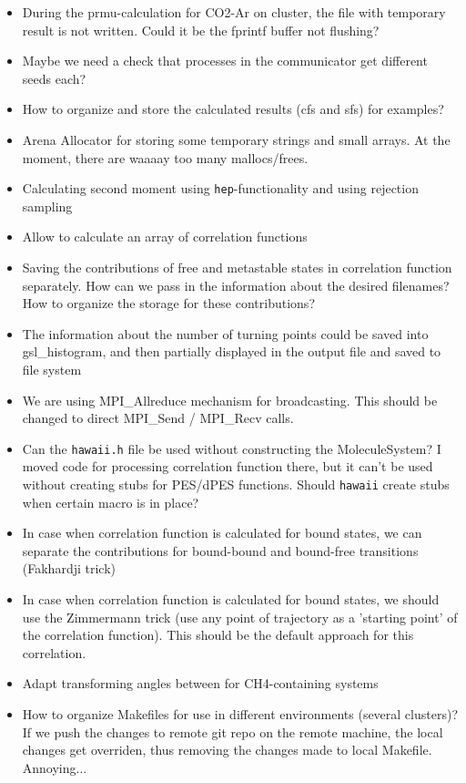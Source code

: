 \documentclass{article}
\begin{document}
\begin{itemize}
    \item During the prmu-calculation for CO2-Ar on cluster, the file with temporary result is not written. Could it be the fprintf buffer not flushing?  
    \item Maybe we need a check that processes in the communicator get different seeds each?
    \item How to organize and store the calculated results (cfs and sfs) for examples?
    \item Arena Allocator for storing some temporary strings and small arrays. At the moment, there are waaaay too many mallocs/frees. 
    \item Calculating second moment using \texttt{hep}-functionality and using rejection sampling
    \item Allow to calculate an array of correlation functions 
    \item Saving the contributions of free and metastable states in correlation function separately. How can we pass in the information about the desired filenames? How to organize the storage for these contributions? 
    \item The information about the number of turning points could be saved into gsl\_histogram, and then partially displayed in the output file and saved to file system
    \item We are using MPI\_Allreduce mechanism for broadcasting. This should be changed to direct MPI\_Send / MPI\_Recv calls.
    \item Can the \texttt{hawaii.h} file be used without constructing the MoleculeSystem? I moved code for processing correlation function there, but it can't be used without creating stubs for PES/dPES functions. Should \texttt{hawaii} create stubs when certain macro is in place? 
    \item In case when correlation function is calculated for bound states, we can separate the contributions for bound-bound and bound-free transitions (Fakhardji trick)
    \item In case when correlation function is calculated for bound states, we should use the Zimmermann trick (use any point of trajectory as a 'starting point' of the correlation function). This should be the default approach for this correlation. 
    \item Adapt transforming angles between for CH4-containing systems
    \item How to organize Makefiles for use in different environments (several clusters)? If we push the changes to remote git repo on the remote machine, the local changes get overriden, thus removing the changes made to local Makefile. Annoying... 

\end{itemize}
\end{document}
